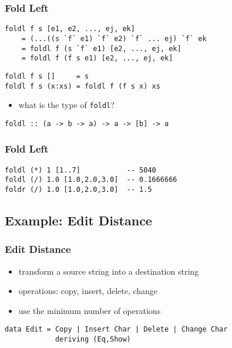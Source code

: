 \documentclass[dvipsnames]{beamer}
\theoremstyle{plain}
\begin{document}
\begin{frame}[fragile]
  \frametitle{Fold Left}

  \begin{block}{}
    \begin{lstlisting}
foldl f s [e1, e2, ..., ej, ek]
    = (...((s `f` e1) `f` e2) `f` ... ej) `f` ek
    = foldl f (s `f` e1) [e2, ..., ej, ek]
    = foldl f (f s e1) [e2, ..., ej, ek]
    \end{lstlisting}
  \end{block}

  \pause
  \begin{exampleblock}{}
    \begin{lstlisting}
foldl f s []     = s
foldl f s (x:xs) = foldl f (f s x) xs
    \end{lstlisting}
  \end{exampleblock}

  \pause
  \begin{itemize}
    \item what is the type of \lstinline{foldl}?
  \end{itemize}

  \begin{lstlisting}
foldl :: (a -> b -> a) -> a -> [b] -> a
  \end{lstlisting}
\end{frame}

\begin{frame}[fragile]
  \frametitle{Fold Left}

  \begin{exampleblock}{}
    \begin{lstlisting}
foldl (*) 1 [1..7]           -- 5040
foldl (/) 1.0 [1.0,2.0,3.0]  -- 0.1666666
foldr (/) 1.0 [1.0,2.0,3.0]  -- 1.5
    \end{lstlisting}
  \end{exampleblock}
\end{frame}

\subsection{Example: Edit Distance}

\begin{frame}[fragile]
  \frametitle{Edit Distance}

  \begin{itemize}
    \item transform a source string into a destination string
    \item operations: copy, insert, delete, change
    \item use the minimum number of operations
  \end{itemize}

  \begin{exampleblock}{}
    \begin{lstlisting}
data Edit = Copy | Insert Char | Delete | Change Char
            deriving (Eq,Show)
    \end{lstlisting}
  \end{exampleblock}
\end{frame}
\end{document}
